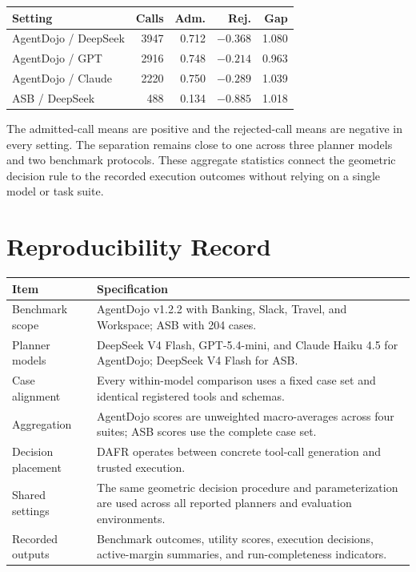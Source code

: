 \documentclass[letterpaper]{article}
\begin{document}
\begin{center}
\small
\setlength{\tabcolsep}{3pt}
\begin{tabular}{lrrrr}
\toprule
Setting & Calls & Adm. & Rej. & Gap\\
\midrule
AgentDojo / DeepSeek & 3947 & 0.712 & $-0.368$ & 1.080\\
AgentDojo / GPT & 2916 & 0.748 & $-0.214$ & 0.963\\
AgentDojo / Claude & 2220 & 0.750 & $-0.289$ & 1.039\\
ASB / DeepSeek & 488 & 0.134 & $-0.885$ & 1.018\\
\bottomrule
\end{tabular}
\label{tab:margin-full}
\end{center}

The admitted-call means are positive and the rejected-call means are negative in every setting. The separation remains close to one across three planner models and two benchmark protocols. These aggregate statistics connect the geometric decision rule to the recorded execution outcomes without relying on a single model or task suite.

\section{Reproducibility Record}

\begin{center}
\small
\begin{tabular}{>{\raggedright\arraybackslash}p{}>{\raggedright\arraybackslash}p{}}
\toprule
Item & Specification\\
\midrule
Benchmark scope & AgentDojo v1.2.2 with Banking, Slack, Travel, and Workspace; ASB with 204 cases.\\
Planner models & DeepSeek V4 Flash, GPT-5.4-mini, and Claude Haiku 4.5 for AgentDojo; DeepSeek V4 Flash for ASB.\\
Case alignment & Every within-model comparison uses a fixed case set and identical registered tools and schemas.\\
Aggregation & AgentDojo scores are unweighted macro-averages across four suites; ASB scores use the complete case set.\\
Decision placement & DAFR operates between concrete tool-call generation and trusted execution.\\
Shared settings & The same geometric decision procedure and parameterization are used across all reported planners and evaluation environments.\\
Recorded outputs & Benchmark outcomes, utility scores, execution decisions, active-margin summaries, and run-completeness indicators.\\
\bottomrule
\end{tabular}
\label{tab:reproducibility}
\end{center}
\end{document}
